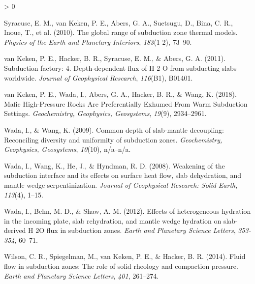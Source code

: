 \documentclass[draft,linenumbers]{agujournal2018}
\newlength{\cslhangindent}
\newenvironment{CSLReferences}[2] %
 {%
  \setlength{\parindent}{0pt}
  \ifodd #1 \everypar{\setlength{\hangindent}{\cslhangindent}}\ignorespaces\fi
  \ifnum #2 > 0
  \setlength{\parskip}{#2\baselineskip}
  \fi
 }%
 {}
\begin{document}
\begin{CSLReferences}{1}{0}
\leavevmode{}%
Syracuse, E. M., van Keken, P. E., Abers, G. A., Suetsugu, D., Bina, C.
R., Inoue, T., et al. (2010). {The global range of subduction zone
thermal models}. \emph{Physics of the Earth and Planetary Interiors},
\emph{183}(1-2), 73--90.

\leavevmode{}%
van Keken, P. E., Hacker, B. R., Syracuse, E. M., \& Abers, G. A.
(2011). {Subduction factory: 4. Depth-dependent flux of H 2 O from
subducting slabs worldwide}. \emph{Journal of Geophysical Research},
\emph{116}(B1), B01401.

\leavevmode{}%
van Keken, P. E., Wada, I., Abers, G. A., Hacker, B. R., \& Wang, K.
(2018). {Mafic High-Pressure Rocks Are Preferentially Exhumed From Warm
Subduction Settings}. \emph{Geochemistry, Geophysics, Geosystems},
\emph{19}(9), 2934--2961.

\leavevmode{}%
Wada, I., \& Wang, K. (2009). {Common depth of slab-mantle decoupling:
Reconciling diversity and uniformity of subduction zones}.
\emph{Geochemistry, Geophysics, Geosystems}, \emph{10}(10), n/a--n/a.

\leavevmode{}%
Wada, I., Wang, K., He, J., \& Hyndman, R. D. (2008). {Weakening of the
subduction interface and its effects on surface heat flow, slab
dehydration, and mantle wedge serpentinization}. \emph{Journal of
Geophysical Research: Solid Earth}, \emph{113}(4), 1--15.

\leavevmode{}%
Wada, I., Behn, M. D., \& Shaw, A. M. (2012). {Effects of heterogeneous
hydration in the incoming plate, slab rehydration, and mantle wedge
hydration on slab-derived H 2O flux in subduction zones}. \emph{Earth
and Planetary Science Letters}, \emph{353-354}, 60--71.

\leavevmode{}%
Wilson, C. R., Spiegelman, M., van Keken, P. E., \& Hacker, B. R.
(2014). {Fluid flow in subduction zones: The role of solid rheology and
compaction pressure}. \emph{Earth and Planetary Science Letters},
\emph{401}, 261--274.

\end{CSLReferences}


\end{document}

